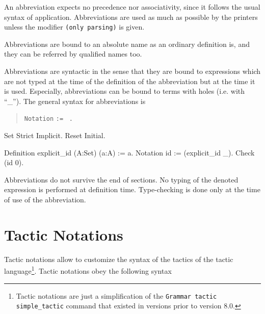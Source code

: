 An abbreviation expects no precedence nor associativity, since it
follows the usual syntax of application. Abbreviations are used as
much as possible by the {\Coq} printers unless the modifier
\verb=(only parsing)= is given.

Abbreviations are bound to an absolute name as an ordinary
definition is, and they can be referred by qualified names too.

Abbreviations are syntactic in the sense that they are bound to
expressions which are not typed at the time of the definition of the
abbreviation but at the time it is used. Especially, abbreviations can
be bound to terms with holes (i.e. with ``\_''). The general syntax
for abbreviations is
\begin{quote}
 \texttt{Notation} {\ident} \sequence{\ident} {\ident} \texttt{:=} {\term} 
 ~\verb=.=
\end{quote}

\Example
\begin{coq_eval}
Set Strict Implicit.
Reset Initial.
\end{coq_eval}
\begin{coq_example}
Definition explicit_id (A:Set) (a:A) := a.
Notation id := (explicit_id _).
Check (id 0).
\end{coq_example}

Abbreviations do not survive the end of sections. No typing of the denoted
expression is performed at definition time. Type-checking is done only
at the time of use of the abbreviation.


\section{Tactic Notations
}

Tactic notations allow to customize the syntax of the tactics of the
tactic language\footnote{Tactic notations are just a simplification of
the {\tt Grammar tactic simple\_tactic} command that existed in
versions prior to version 8.0.}. Tactic notations obey the following
syntax
\medskip

